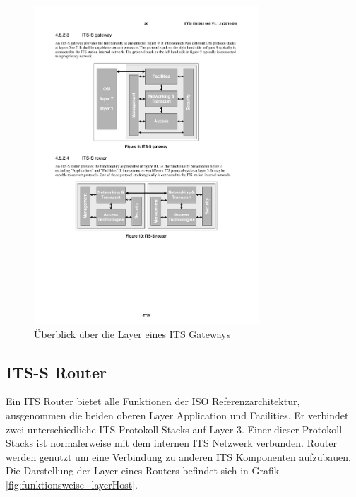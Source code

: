 \begin{figure}[h]
	\includegraphics[width=0.75\textwidth]{content/images/01_funktionsweise/layer_gateway.pdf}
	\caption{Überblick über die Layer eines ITS Gateways \cite{en302665}}
	\label{fig:funktionsweise_itsGateway}
\end{figure}


\subsection{ITS-S Router \label{funktionsweise_router}}
Ein \ac{ITS} Router bietet alle Funktionen der \ac{ISO} Referenzarchitektur, ausgenommen die beiden oberen Layer Application und Facilities. Er verbindet zwei unterschiedliche \ac{ITS} Protokoll Stacks auf Layer 3. Einer dieser Protokoll Stacks ist normalerweise mit dem internen \ac{ITS} Netzwerk verbunden. Router werden genutzt um eine Verbindung zu anderen \ac{ITS} Komponenten aufzubauen. Die Darstellung der Layer eines Routers befindet sich in Grafik  \ref{fig:funktionsweise_layerHost}.

